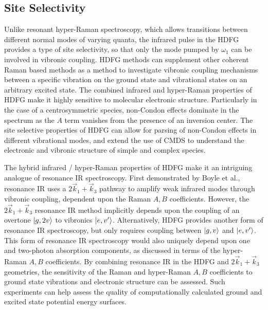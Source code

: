 \documentclass[aip, jcp, reprint, onecolumn]{revtex4-2}
\begin{document}
\subsection{Site Selectivity}
Unlike resonant hyper-Raman spectroscopy, which allows transitions between different normal modes of varying quanta, the infrared pulse in the HDFG provides a type of site selectivity,\cite{RN103, Carlson1991} so that only the mode pumped by $\omega_1$ can be involved in vibronic coupling.  
HDFG methods can supplement other coherent Raman based methods as a method to investigate vibronic coupling mechanisms between a specific vibration on the ground state and vibrational states on an arbitrary excited state.\cite{RN103}
The combined infrared and hyper-Raman properties of HDFG make it highly sensitive to molecular electronic structure.
Particularly in the case of a centrosymmetric species, non-Condon effects dominate in the spectrum as the $A$ term vanishes from the presence of an inversion center.
The site selective properties of HDFG can allow for parsing of non-Condon effects in different vibrational modes, and extend the use of CMDS to understand the electronic and vibronic structure of simple and complex species.

The hybrid infrared / hyper-Raman properties of HDFG make it an intriguing analogue of resonance IR spectroscopy.
First demonstrated by Boyle et al., resonance IR uses a $2\vec{k}_1 + \vec{k}_3$ pathway to amplify weak infrared modes through vibronic coupling, dependent upon the Raman $A,B$ coefficients. \cite{RN491}
However, the $2\vec{k}_1 + \vec{k}_3$ resonance IR method implicitly depends upon the coupling of an overtone $\ket{g,2v}$ to vibronics $\ket{e,v'}$.
Alternatively, HDFG provides another form of resonance IR spectroscopy, but only requires coupling between $\ket{g,v}$ and $\ket{e,v'}$.
This form of resonance IR spectroscopy would also uniquely depend upon one and two-photon absorption components, as discussed in terms of the hyper-Raman $A,B$ coefficients.
By combining resonance IR in the HDFG and $2\vec{k}_1 + \vec{k}_3$ geometries, the sensitivity of the Raman and hyper-Raman $A,B$ coefficients to ground state vibrations and electronic structure can be assessed. 
Such experiments can help assess the quality of computationally calculated ground and excited state potential energy surfaces. 
\end{document}
